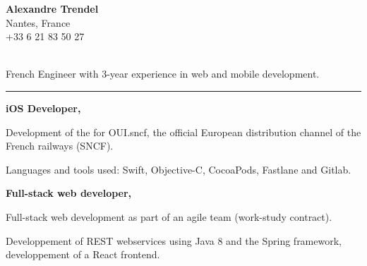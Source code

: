 \documentclass{cv}
\begin{document}
\pagestyle{empty}

\noindent\begin{minipage}[t]{0.3\textwidth}

\textbf{\large Alexandre Trendel} \\
Nantes, France \\
 +33 6 21 83 50 27 \\
 \href{mailto:trendel.alexandre@gmail.com}{} \\
 \href{https://github.com/xou816}{}

\end{minipage}
\hfill
\begin{minipage}[t]{0.5\textwidth}

\large

French Engineer with 3-year experience in web and mobile development.

\begin{center}\color{solred}\rule{2cm}{1pt}\end{center}

\end{minipage}

\vspace{1cm}


\begin{mainexpbox}[title=nov. 2019 -- today]

	\begin{minipage}[c]{20mm}
	\end{minipage}
	\begin{minipage}[c]{0.8\textwidth}

	\textbf{iOS Developer, \evtech{}}

	Development of the \href{https://apps.apple.com/fr/app/oui-sncf-train-et-bus/id343889987}{} for OUI.sncf, the official European distribution channel of the French railways (SNCF).

	Languages and tools used: Swift, Objective-C, CocoaPods, Fastlane and Gitlab.
	\end{minipage}

\end{mainexpbox}

\begin{expbox}[title={dec. 2016, \faicon{clock-o} 3 years}]

	\begin{minipage}[c]{20mm}
	\end{minipage}
	\begin{minipage}[c]{0.8\textwidth}

	\textbf{Full-stack web developer, \evtech{}}

	Full-stack web development as part of an agile team (work-study contract).

	Developpement of REST webservices using Java 8 and the Spring framework, developpement of a React frontend.
	\end{minipage}

\end{expbox}
\end{document}
